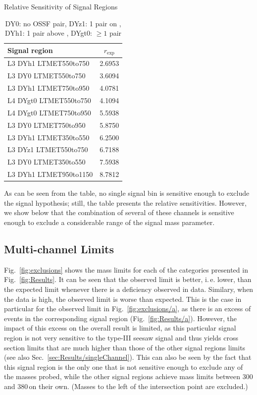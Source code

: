 \begin{table}
\centering
\caption{Relative Sensitivity of Signal Regions} \label{tab:topSensitivity}
\caption*{DY0: no OSSF pair, DYz1: 1 pair on \Z,\\ DYh1: 1 pair above \Z, DYgt0: $\geq 1$ pair}
\begin{tabular}{l c}
\hline\hline
Signal region & $r_\textrm{exp}$\\
\hline
L3 DYh1 LTMET550to750 & 2.6953\\
L3 DY0 LTMET550to750 & 3.6094\\
L3 DYh1 LTMET750to950 & 4.0781\\
L4 DYgt0 LTMET550to750 & 4.1094\\
L4 DYgt0 LTMET750to950 & 5.5938\\
\hline
L3 DY0 LTMET750to950 & 5.8750\\
L3 DYh1 LTMET350to550 & 6.2500\\
L3 DYz1 LTMET550to750 & 6.7188\\
L3 DY0 LTMET350to550 & 7.5938\\
L3 DYh1 LTMET950to1150 & 8.7812\\
\end{tabular}
\end{table}

As can be seen from the table, no single signal bin is sensitive enough to exclude the signal hypothesis; still, the table presents the relative sensitivities. However, we show below that the combination of several of these channels is sensitive enough to exclude a considerable range of the signal mass parameter.

\subsection{Multi-channel Limits}
Fig.~\ref{fig:exclusions} shows the mass limits for each of the categories presented in Fig.~\ref{fig:Results}. It can be seen that the observed limit is better, i.\,e. lower, than the expected limit whenever there is a deficiency observed in data. Similary, when the data is high, the observed limit is worse than expected. This is the case in particular for the observed limit in Fig.~\ref{fig:exclusions/a}, as there is an excess of events in the corresponding signal region (Fig.~\ref{fig:Results/a}). However, the impact of this excess on the overall result is limited, as this particular signal region is not very sensitive to the type-III seesaw signal and thus yields cross section limits that are much higher than those of the other signal regions limits (see also Sec.~\ref{sec:Results/singleChannel}). This can also be seen by the fact that this signal region is the only one that is not sensitive enough to exclude any of the masses probed, while the other signal regions achieve mass limits between 300 and 380\,\GeV on their own. (Masses to the left of the intersection point are excluded.)

